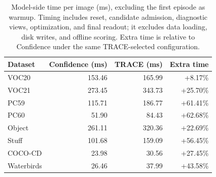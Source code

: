 \begin{table}[t]
\caption{Model-side time per image (ms), excluding the first episode as warmup. Timing includes reset, candidate admission, diagnostic views, optimization, and final readout; it excludes data loading, disk writes, and offline scoring. Extra time is relative to Confidence under the same TRACE-selected configuration.}
\label{tab:tuned-full-cost}
\centering\small
\begin{tabular}{@{}lrrr@{}}
\toprule
Dataset & Confidence (ms) & TRACE (ms) & Extra time \\
\midrule
VOC20 & 153.46 & 165.99 & +8.17\% \\
VOC21 & 273.45 & 343.73 & +25.70\% \\
PC59 & 115.71 & 186.77 & +61.41\% \\
PC60 & 51.90 & 84.43 & +62.68\% \\
Object & 261.11 & 320.36 & +22.69\% \\
Stuff & 101.68 & 159.09 & +56.45\% \\
COCO-CD & 23.98 & 30.56 & +27.45\% \\
Waterbirds & 26.46 & 37.99 & +43.58\% \\
\bottomrule
\end{tabular}
\end{table}
